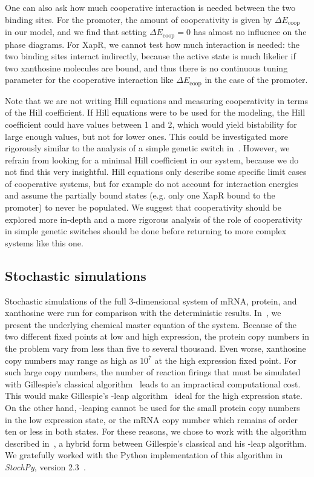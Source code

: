 \documentclass[10pt,letterpaper]{article}
\newcommand{\n}[1]{\mathrm{#1}}
\begin{document}
	One can also ask how much cooperative interaction is needed between the two
	binding sites. For the promoter, the amount of cooperativity is given by $\Delta E_{\n{coop}}$ in
	our model, and we find that setting $\Delta E_{\n{coop}} = 0$ has almost no
	influence on the phase diagrams. For XapR, we cannot test how much interaction is needed: the two binding sites interact
	indirectly, because the active state is much likelier if two xanthosine
	molecules are bound, and thus there is no continuous tuning parameter for the cooperative interaction
	like $\Delta E_{\n{coop}}$ in the case of the promoter.
	
	Note that we are not writing Hill equations and measuring cooperativity in
	terms of the Hill coefficient. If Hill equations were to be used for the
	modeling, the Hill coefficient could have values between 1 and 2, which
	would yield bistability for large enough values, but not for lower ones.
	This could be investigated more rigorously similar to the analysis of a
	simple genetic switch in~\cite{Cherry2000}. However, we refrain from looking
	for a minimal Hill coefficient in our system, because we do not find this
	very insightful. Hill equations only describe some specific limit cases of cooperative systems, but for example do not account for interaction energies and assume the partially bound states (e.g. only one XapR bound to the promoter) to never be populated.
	We suggest that cooperativity should be explored more in-depth and a more
	rigorous analysis of the role of cooperativity in simple genetic switches
	should be done before returning to more complex systems like this one.
	
	\subsection*{Stochastic simulations}
	Stochastic simulations of the full 3-dimensional system of mRNA, protein,
	and xanthosine were run for comparison with the deterministic results.
	In~, we present the underlying chemical master equation of
	the system. Because of the two different fixed points at low and high
	expression, the protein copy numbers in the problem vary from less than
	five to several thousand. Even worse, xanthosine copy numbers may range
	as high as $10^7$ at the high expression fixed point. For such large
	copy numbers, the number of reaction firings that must be simulated with
	Gillespie's classical algorithm~\cite{Gillespie1976} leads to an impractical computational
	cost. This would make Gillespie's \texttau-leap algorithm~\cite{Gillespie2001} ideal for the high
	expression state. On the other hand, \texttau-leaping cannot be used for
	the small protein copy numbers in the low expression state, or the mRNA
	copy number which remains of order ten or less in both states. For
	these reasons, we chose to work with the algorithm described
	in~\cite{Cao2006}, a hybrid form between Gillespie's classical and his
	\texttau-leap algorithm. We gratefully worked with the Python implementation
	of this algorithm in \emph{StochPy}, version 2.3~\cite{Maarleveld2015}.
	
\end{document}
